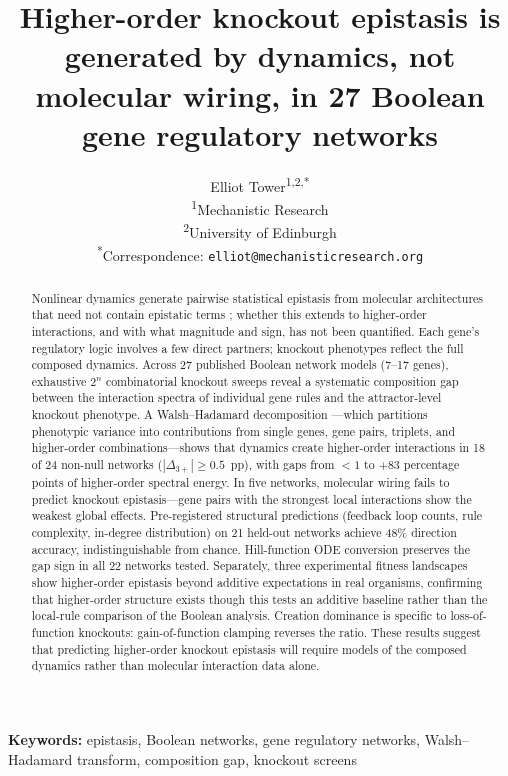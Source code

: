 \documentclass[10pt]{article}
\title{Higher-order knockout epistasis is generated by dynamics, not molecular wiring, in 27 Boolean gene regulatory networks}
\author{
  Elliot Tower\textsuperscript{1,2,*} \\[4pt]
  \small\textsuperscript{1}Mechanistic Research \\
  \small\textsuperscript{2}University of Edinburgh \\
  \small\textsuperscript{*}Correspondence: \texttt{elliot@mechanisticresearch.org}
}
\begin{document}
\maketitle
\linenumbers
\doublespacing

\begin{abstract}
Nonlinear dynamics generate pairwise statistical epistasis from
molecular architectures that need not contain epistatic terms
\citep{gjuvsland2007statistical}; whether this extends to
higher-order interactions, and with what magnitude and sign, has not
been quantified. Each gene's regulatory logic involves a few direct
partners; knockout phenotypes reflect the full composed dynamics.
Across 27 published Boolean network models (7--17 genes), exhaustive
$2^n$ combinatorial knockout sweeps reveal a systematic composition
gap between the interaction spectra of individual gene rules and the
attractor-level knockout phenotype. A Walsh--Hadamard decomposition
---which partitions phenotypic variance into contributions from
single genes, gene pairs, triplets, and higher-order
combinations---shows that dynamics create higher-order interactions
in 18 of 24 non-null networks ($|\Delta_{3+}| \geq 0.5$~pp), with
gaps from $< 1$ to $+83$ percentage points of higher-order spectral
energy. In five networks, molecular wiring fails to predict knockout
epistasis---gene pairs with the strongest local interactions show the
weakest global effects. Pre-registered structural predictions
(feedback loop counts, rule complexity, in-degree distribution) on 21
held-out networks achieve 48\% direction accuracy, indistinguishable
from chance. Hill-function ODE conversion preserves the gap sign in
all 22 networks tested. Separately, three experimental fitness
landscapes show higher-order epistasis beyond additive expectations
in real organisms, confirming that higher-order structure exists
though this tests an additive baseline rather than the local-rule
comparison of the Boolean analysis. Creation dominance is specific to
loss-of-function knockouts: gain-of-function clamping reverses the
ratio. These results suggest that predicting higher-order knockout
epistasis will require models of the composed dynamics rather than
molecular interaction data alone.
\end{abstract}

\noindent\textbf{Keywords:}
epistasis, Boolean networks, gene regulatory networks,
Walsh--Hadamard transform, composition gap, knockout screens
\end{document}
